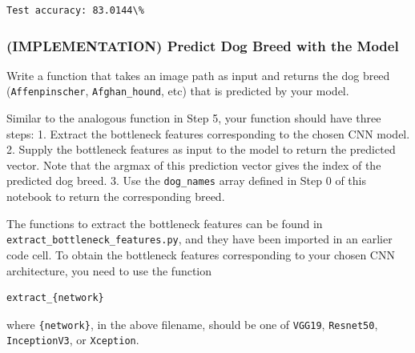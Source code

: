 \documentclass[11pt]{article}
\begin{document}
    \begin{Verbatim}[commandchars=\\\{\}]
Test accuracy: 83.0144\%

    \end{Verbatim}

    \subsubsection{(IMPLEMENTATION) Predict Dog Breed with the
Model}\label{implementation-predict-dog-breed-with-the-model}

Write a function that takes an image path as input and returns the dog
breed (\texttt{Affenpinscher}, \texttt{Afghan\_hound}, etc) that is
predicted by your model.

Similar to the analogous function in Step 5, your function should have
three steps: 1. Extract the bottleneck features corresponding to the
chosen CNN model. 2. Supply the bottleneck features as input to the
model to return the predicted vector. Note that the argmax of this
prediction vector gives the index of the predicted dog breed. 3. Use the
\texttt{dog\_names} array defined in Step 0 of this notebook to return
the corresponding breed.

The functions to extract the bottleneck features can be found in
\texttt{extract\_bottleneck\_features.py}, and they have been imported
in an earlier code cell. To obtain the bottleneck features corresponding
to your chosen CNN architecture, you need to use the function

\begin{verbatim}
extract_{network}
\end{verbatim}

where \texttt{\{network\}}, in the above filename, should be one of
\texttt{VGG19}, \texttt{Resnet50}, \texttt{InceptionV3}, or
\texttt{Xception}.
\end{document}
